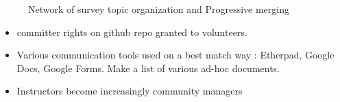 \begin{figure}[ht!]
\centering
\caption{Network of survey topic organization and Progressive merging}
\label{overflow}
\end{figure}




\begin{itemize}
  \item committer rights on github repo granted to volunteers.
  \item Various communication tools used on a best match way : Etherpad, Google Docs, Google Forms. Make a list of various ad-hoc documents.
  \item Instructors become increasingly community managers
\end{itemize}

